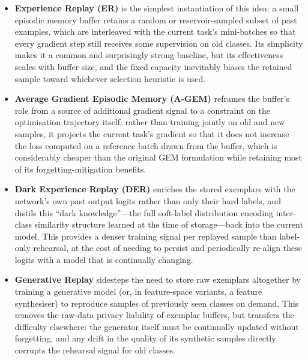 \begin{itemize}
	\item \textbf{Experience Replay (ER)} \cite{Chaudhry2019ContinualLW} is the simplest instantiation of this idea: a small episodic memory buffer retains a random or reservoir-sampled subset of past examples, which are interleaved with the current task's mini-batches so that every gradient step still receives some supervision on old classes. Its simplicity makes it a common and surprisingly strong baseline, but its effectiveness scales with buffer size, and the fixed capacity inevitably biases the retained sample toward whichever selection heuristic is used.
	
	\item \textbf{Average Gradient Episodic Memory (A-GEM)} \cite{agem} reframes the buffer's role from a source of additional gradient signal to a constraint on the optimisation trajectory itself: rather than training jointly on old and new samples, it projects the current task's gradient so that it does not increase the loss computed on a reference batch drawn from the buffer, which is considerably cheaper than the original GEM formulation while retaining most of its forgetting-mitigation benefits.
	
	\item \textbf{Dark Experience Replay (DER)} \cite{buzzega2020darkexperiencegeneralcontinual} enriches the stored exemplars with the network's own past output logits rather than only their hard labels, and distils this ``dark knowledge''---the full soft-label distribution encoding inter-class similarity structure learned at the time of storage---back into the current model. This provides a denser training signal per replayed sample than label-only rehearsal, at the cost of needing to persist and periodically re-align these logits with a model that is continually changing.
	
	\item \textbf{Generative Replay} \cite{generative_features} sidesteps the need to store raw exemplars altogether by training a generative model (or, in feature-space variants, a feature synthesiser) to reproduce samples of previously seen classes on demand. This removes the raw-data privacy liability of exemplar buffers, but transfers the difficulty elsewhere: the generator itself must be continually updated without forgetting, and any drift in the quality of its synthetic samples directly corrupts the rehearsal signal for old classes.
\end{itemize}

